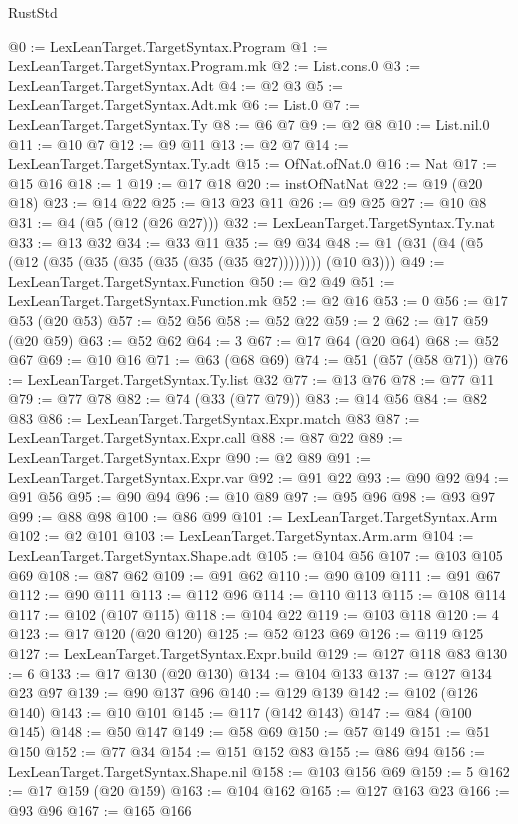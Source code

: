 \begin{lexlean}{RustStd}
\begin{coremodule}
@0 := LexLeanTarget.TargetSyntax.Program
@1 := LexLeanTarget.TargetSyntax.Program.mk
@2 := List.cons.{0}
@3 := LexLeanTarget.TargetSyntax.Adt
@4 := @2 @3
@5 := LexLeanTarget.TargetSyntax.Adt.mk
@6 := List.{0}
@7 := LexLeanTarget.TargetSyntax.Ty
@8 := @6 @7
@9 := @2 @8
@10 := List.nil.{0}
@11 := @10 @7
@12 := @9 @11
@13 := @2 @7
@14 := LexLeanTarget.TargetSyntax.Ty.adt
@15 := OfNat.ofNat.{0}
@16 := Nat
@17 := @15 @16
@18 := 1
@19 := @17 @18
@20 := instOfNatNat
@22 := @19 (@20 @18)
@23 := @14 @22
@25 := @13 @23 @11
@26 := @9 @25
@27 := @10 @8
@31 := @4 (@5 (@12 (@26 @27)))
@32 := LexLeanTarget.TargetSyntax.Ty.nat
@33 := @13 @32
@34 := @33 @11
@35 := @9 @34
@48 := @1 (@31 (@4 (@5 (@12 (@35 (@35 (@35 (@35 (@35 (@35 @27)))))))) (@10 @3)))
@49 := LexLeanTarget.TargetSyntax.Function
@50 := @2 @49
@51 := LexLeanTarget.TargetSyntax.Function.mk
@52 := @2 @16
@53 := 0
@56 := @17 @53 (@20 @53)
@57 := @52 @56
@58 := @52 @22
@59 := 2
@62 := @17 @59 (@20 @59)
@63 := @52 @62
@64 := 3
@67 := @17 @64 (@20 @64)
@68 := @52 @67
@69 := @10 @16
@71 := @63 (@68 @69)
@74 := @51 (@57 (@58 @71))
@76 := LexLeanTarget.TargetSyntax.Ty.list @32
@77 := @13 @76
@78 := @77 @11
@79 := @77 @78
@82 := @74 (@33 (@77 @79))
@83 := @14 @56
@84 := @82 @83
@86 := LexLeanTarget.TargetSyntax.Expr.match @83
@87 := LexLeanTarget.TargetSyntax.Expr.call
@88 := @87 @22
@89 := LexLeanTarget.TargetSyntax.Expr
@90 := @2 @89
@91 := LexLeanTarget.TargetSyntax.Expr.var
@92 := @91 @22
@93 := @90 @92
@94 := @91 @56
@95 := @90 @94
@96 := @10 @89
@97 := @95 @96
@98 := @93 @97
@99 := @88 @98
@100 := @86 @99
@101 := LexLeanTarget.TargetSyntax.Arm
@102 := @2 @101
@103 := LexLeanTarget.TargetSyntax.Arm.arm
@104 := LexLeanTarget.TargetSyntax.Shape.adt
@105 := @104 @56
@107 := @103 @105 @69
@108 := @87 @62
@109 := @91 @62
@110 := @90 @109
@111 := @91 @67
@112 := @90 @111
@113 := @112 @96
@114 := @110 @113
@115 := @108 @114
@117 := @102 (@107 @115)
@118 := @104 @22
@119 := @103 @118
@120 := 4
@123 := @17 @120 (@20 @120)
@125 := @52 @123 @69
@126 := @119 @125
@127 := LexLeanTarget.TargetSyntax.Expr.build
@129 := @127 @118 @83
@130 := 6
@133 := @17 @130 (@20 @130)
@134 := @104 @133
@137 := @127 @134 @23 @97
@139 := @90 @137 @96
@140 := @129 @139
@142 := @102 (@126 @140)
@143 := @10 @101
@145 := @117 (@142 @143)
@147 := @84 (@100 @145)
@148 := @50 @147
@149 := @58 @69
@150 := @57 @149
@151 := @51 @150
@152 := @77 @34
@154 := @151 @152 @83
@155 := @86 @94
@156 := LexLeanTarget.TargetSyntax.Shape.nil
@158 := @103 @156 @69
@159 := 5
@162 := @17 @159 (@20 @159)
@163 := @104 @162
@165 := @127 @163 @23
@166 := @93 @96
@167 := @165 @166

\end{coremodule}
\end{lexlean}
